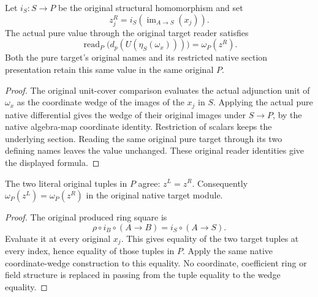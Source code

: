 \begin{lemma}
\label{lem:kn-mixed-native-coordinate-right-value}
\leanok
Let $i_S:S\to P$ be the original structural homomorphism and set
\[
 z^R_j=i_S(\operatorname{im}_{A\to S}(x_j)).
\]
The actual pure value through the original target reader satisfies
\[
 \operatorname{read}_P\bigl(d_p(U(\eta_S(\omega_x)))\bigr)
   =\omega_P(z^R).
\]
Both the pure target's original names and its restricted native section
presentation retain this same value in the same original $P$.
\end{lemma}
\begin{proof}
The original unit-cover comparison evaluates the actual adjunction unit
of $\omega_x$ as
the coordinate wedge of the images of the $x_j$ in $S$. Applying the
actual pure native differential gives the wedge of their original
images under $S\to P$, by the native algebra-map coordinate identity.
Restriction of scalars keeps the underlying section. Reading the same
original pure target through its two defining names leaves the value
unchanged. These original reader identities give the displayed formula.
\end{proof}

\begin{lemma}
\label{lem:kn-mixed-native-coordinate-target-wedge}
\leanok
The two literal original tuples in $P$ agree:
$z^L=z^R$. Consequently
$\omega_P(z^L)=\omega_P(z^R)$ in the original native target module.
\end{lemma}
\begin{proof}
The original produced ring square is
\[
 \rho\circ i_B\circ(A\to B)=i_S\circ(A\to S).
\]
Evaluate it at every original $x_j$. This gives equality of the two
target tuples at every index, hence equality of those tuples in $P$.
Apply the same native coordinate-wedge construction to this equality.
No coordinate, coefficient ring or field structure is replaced in
passing from the tuple equality to the wedge equality.
\end{proof}

